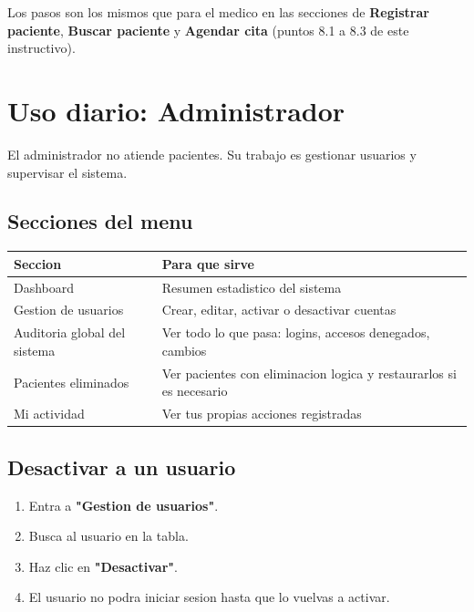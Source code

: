 \documentclass[11pt,a4paper]{article}
\begin{document}
Los pasos son los mismos que para el medico en las secciones de \textbf{Registrar paciente}, \textbf{Buscar paciente} y \textbf{Agendar cita} (puntos 8.1 a 8.3 de este instructivo).
\section{Uso diario: Administrador}

El administrador no atiende pacientes. Su trabajo es gestionar usuarios y supervisar el sistema.

\subsection{Secciones del menu}

\begin{center}
    \begin{tabular}{|L{5cm}|L{8cm}|}
        \hline
        \textbf{Seccion}             & \textbf{Para que sirve}                                             \\
        \hline
        Dashboard                    & Resumen estadistico del sistema                                     \\
        \hline
        Gestion de usuarios          & Crear, editar, activar o desactivar cuentas                         \\
        \hline
        Auditoria global del sistema & Ver todo lo que pasa: logins, accesos denegados, cambios            \\
        \hline
        Pacientes eliminados         & Ver pacientes con eliminacion logica y restaurarlos si es necesario \\
        \hline
        Mi actividad                 & Ver tus propias acciones registradas                                \\
        \hline
    \end{tabular}
\end{center}

\subsection{Desactivar a un usuario}

\begin{enumerate}
    \item Entra a \textbf{"Gestion de usuarios"}.
    \item Busca al usuario en la tabla.
    \item Haz clic en \textbf{"Desactivar"}.
    \item El usuario no podra iniciar sesion hasta que lo vuelvas a activar.
\end{enumerate}
\end{document}
